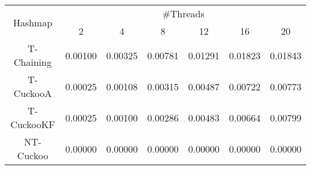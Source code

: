 \begin{tabular}{|c|c|c|c|c|c|c|}
\hline
\multirow{2}{*}{Hashmap} & \multicolumn{6}{c|}{\#Threads}\\\cline{2-7}& 2 & 4 & 8 & 12 & 16 & 20\\
\hline
\hline
T-Chaining & 0.00100 & 0.00325 & 0.00781 & 0.01291 & 0.01823 & 0.01843\\
T-CuckooA & 0.00025 & 0.00108 & 0.00315 & 0.00487 & 0.00722 & 0.00773\\
T-CuckooKF & 0.00025 & 0.00100 & 0.00286 & 0.00483 & 0.00664 & 0.00799\\
NT-Cuckoo & 0.00000 & 0.00000 & 0.00000 & 0.00000 & 0.00000 & 0.00000\\
\hline
\end{tabular}
